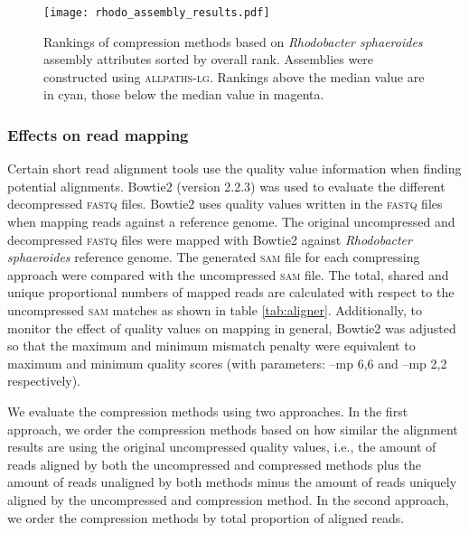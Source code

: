 \begin{figure}[!htb]%
\begin{center}
\texttt{[image: rhodo\_assembly\_results.pdf]}
\end{center}
\renewcommand{\baselinestretch}{1}
\small\normalsize
\begin{quote}
\caption[Rankings of compression methods based on \textit{Rhodobacter
    sphaeroides} assembly attributes]{Rankings of compression methods based on \textit{Rhodobacter
    sphaeroides} assembly attributes sorted by overall
  rank. Assemblies were constructed using \textsc{allpaths-lg}.
  Rankings above the median value are in cyan, those below the median
  value in magenta.}
  \label{fig:assembly_ranks}
\end{quote}
\end{figure}
\renewcommand{\baselinestretch}{2}
\small\normalsize


\subsubsection{Effects on read mapping}

Certain short read alignment tools use the quality value
information when finding potential alignments. Bowtie2 (version 2.2.3)
was used to evaluate the different decompressed \textsc{fastq}
files. Bowtie2 uses quality values written in the \textsc{fastq} files
when mapping reads against a reference genome. The original
uncompressed and decompressed \textsc{fastq} files were mapped with
Bowtie2 against \textit{Rhodobacter sphaeroides} reference genome. The
generated \textsc{sam} file for each compressing approach were
compared with the uncompressed \textsc{sam} file. The total, shared
and unique proportional numbers of mapped reads are calculated with
respect to the uncompressed \textsc{sam} matches as shown in table
\ref{tab:aligner}. Additionally, to monitor the effect of quality
values on mapping in general, Bowtie2 was adjusted so that the maximum
and minimum mismatch penalty were equivalent to maximum and minimum
quality scores (with parameters: --mp 6,6 and --mp 2,2 respectively).

We evaluate the compression methods using two approaches. In the
first approach, we order the compression methods based on how similar
the alignment results are using the original uncompressed quality values, i.e., the
amount of reads aligned by both the uncompressed and compressed
methods plus the amount of reads unaligned by both methods minus the
amount of reads uniquely aligned by the uncompressed and compression
method. In the second approach, we order the compression methods by
total proportion of aligned reads.

